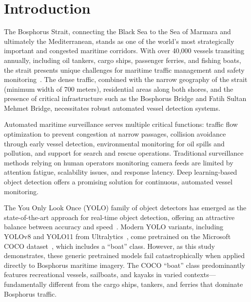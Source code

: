 \documentclass[pdflatex,sn-mathphys-num,Numbered]{sn-jnl}
\begin{document}

\maketitle

\section{Introduction}\label{sec:introduction}

The Bosphorus Strait, connecting the Black Sea to the Sea of Marmara and ultimately the Mediterranean, stands as one of the world's most strategically important and congested maritime corridors. With over 40,000 vessels transiting annually, including oil tankers, cargo ships, passenger ferries, and fishing boats, the strait presents unique challenges for maritime traffic management and safety monitoring~\cite{turkishstraits2023}. The dense traffic, combined with the narrow geography of the strait (minimum width of 700 meters), residential areas along both shores, and the presence of critical infrastructure such as the Bosphorus Bridge and Fatih Sultan Mehmet Bridge, necessitates robust automated vessel detection systems.

Automated maritime surveillance serves multiple critical functions: traffic flow optimization to prevent congestion at narrow passages, collision avoidance through early vessel detection, environmental monitoring for oil spills and pollution, and support for search and rescue operations. Traditional surveillance methods relying on human operators monitoring camera feeds are limited by attention fatigue, scalability issues, and response latency. Deep learning-based object detection offers a promising solution for continuous, automated vessel monitoring.

The You Only Look Once (YOLO) family of object detectors has emerged as the state-of-the-art approach for real-time object detection, offering an attractive balance between accuracy and speed~\cite{redmon2016yolo}. Modern YOLO variants, including YOLOv8 and YOLO11 from Ultralytics~\cite{ultralytics2024yolo11}, come pretrained on the Microsoft COCO dataset~\cite{lin2014coco}, which includes a ``boat'' class. However, as this study demonstrates, these generic pretrained models fail catastrophically when applied directly to Bosphorus maritime imagery. The COCO ``boat'' class predominantly features recreational vessels, sailboats, and kayaks in varied contexts---fundamentally different from the cargo ships, tankers, and ferries that dominate Bosphorus traffic.
\end{document}
